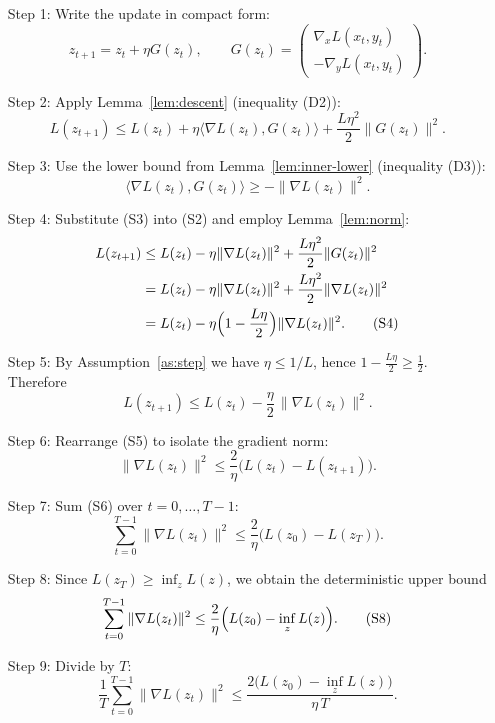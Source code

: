 \documentclass{article}
\begin{document}
\begin{enumerate}
\item[Step 1:]  Write the update in compact form:
\[
z_{t+1}=z_t+\eta G(z_t),\qquad 
G(z_t)=\begin{pmatrix}\nabla_x L(x_t,y_t)\\ -\nabla_y L(x_t,y_t)\end{pmatrix}.
\]

\item[Step 2:]  Apply Lemma~\ref{lem:descent} (inequality (D2)):
\[
L(z_{t+1})\le L(z_t)+\eta\langle\nabla L(z_t),G(z_t)\rangle
+\frac{L\eta^{2}}{2}\|G(z_t)\|^{2}. \tag{S2}
\]

\item[Step 3:]  Use the lower bound from Lemma~\ref{lem:inner-lower} (inequality (D3)):
\[
\langle\nabla L(z_t),G(z_t)\rangle
\ge -\|\nabla L(z_t)\|^{2}. \tag{S3}
\]

\item[Step 4:]  Substitute (S3) into (S2) and employ Lemma~\ref{lem:norm}:
\[
\begin{aligned}
L(z_{t+1})
&\le L(z_t)-\eta\|\nabla L(z_t)\|^{2}
+\frac{L\eta^{2}}{2}\|G(z_t)\|^{2} \\
&= L(z_t)-\eta\|\nabla L(z_t)\|^{2}
+\frac{L\eta^{2}}{2}\|\nabla L(z_t)\|^{2} \\
&= L(z_t)-\eta\Bigl(1-\frac{L\eta}{2}\Bigr)\|\nabla L(z_t)\|^{2}. \tag{S4}
\end{aligned}
\]

\item[Step 5:]  By Assumption~\ref{as:step} we have $\eta\le 1/L$, hence
$1-\frac{L\eta}{2}\ge \frac12$.  Therefore
\[
L(z_{t+1})\le L(z_t)-\frac{\eta}{2}\,\|\nabla L(z_t)\|^{2}. \tag{S5}
\]

\item[Step 6:]  Rearrange (S5) to isolate the gradient norm:
\[
\|\nabla L(z_t)\|^{2}\le \frac{2}{\eta}\bigl(L(z_t)-L(z_{t+1})\bigr). \tag{S6}
\]

\item[Step 7:]  Sum (S6) over $t=0,\dots,T-1$:
\[
\sum_{t=0}^{T-1}\|\nabla L(z_t)\|^{2}
\le \frac{2}{\eta}\bigl(L(z_0)-L(z_T)\bigr). \tag{S7}
\]

\item[Step 8:]  Since $L(z_T)\ge \inf_{z}L(z)$, we obtain the deterministic upper bound
\[
\sum_{t=0}^{T-1}\|\nabla L(z_t)\|^{2}
\le \frac{2}{\eta}\Bigl(L(z_0)-\inf_{z}L(z)\Bigr). \tag{S8}
\]

\item[Step 9:]  Divide by $T$:
\[
\frac{1}{T}\sum_{t=0}^{T-1}\|\nabla L(z_t)\|^{2}
\le \frac{2\big(L(z_0)-\inf_{z}L(z)\big)}{\eta\,T}. \tag{S9}
\]


\end{enumerate}
\end{document}

